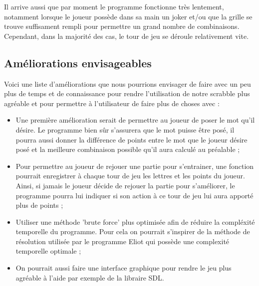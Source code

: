 \documentclass[a4paper,8pt,french,fleqn]{article}
\begin{document}
Il arrive aussi que par moment le programme fonctionne très lentement, notamment lorsque le joueur possède dans sa main un joker et/ou que la grille se trouve suffisament rempli pour permettre un grand nombre de combinaisons. Cependant, dans la majorité des cas, le tour de jeu se déroule relativement vite.

\subsection{Améliorations envisageables}

Voici une liste d'améliorations que nous pourrions envisager de faire avec un peu plus de temps et de connaissance pour rendre l'utilisation de notre scrabble plus agréable et pour permettre à l'utilisateur de faire plus de choses avec : \\

\begin{itemize}

\item Une première amélioration serait de permettre au joueur de poser le mot qu'il désire. Le programme bien sûr s'assurera que le mot puisse être posé, il pourra aussi donner la différence de points entre le mot que le joueur désire posé et la meilleure combinaison possible qu'il aura calculé au préalable ; \\

\item Pour permettre au joueur de rejouer une partie pour s'entrainer, une fonction pourrait enregistrer à chaque tour de jeu les lettres et les points du joueur. Ainsi, si jamais le joueur décide de rejouer la partie pour s'améliorer, le programme pourra lui indiquer si son action à ce tour de jeu lui aura apporté plus de points ; \\

\item Utiliser une méthode 'brute force' plus optimisée afin de réduire la compléxité temporelle du programme. Pour cela on pourrait s'inspirer de la méthode de résolution utilisée par le programme Eliot qui possède une complexité temporelle optimale ; \\

\item On pourrait aussi faire une interface graphique pour rendre le jeu plus agréable à l'aide par exemple de la libraire SDL. \\

\end{itemize}
\end{document}
